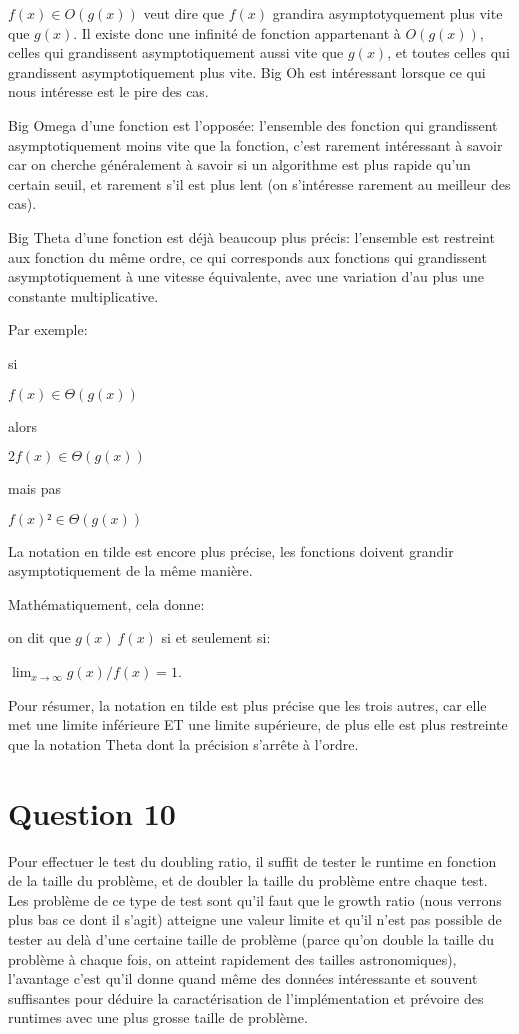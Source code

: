 \documentclass[a4paper,10pt]{article}
\begin{document}
$f(x) \in O(g(x))$ veut dire que $f(x)$ grandira asymptotyquement plus vite que $g(x)$. Il existe donc une infinité de fonction appartenant à $O(g(x))$, celles qui grandissent asymptotiquement aussi vite que $g(x)$, et toutes celles qui grandissent asymptotiquement plus vite. Big Oh est intéressant lorsque ce qui nous intéresse est le pire des cas.

Big Omega d'une fonction est l'opposée: l'ensemble des fonction qui grandissent asymptotiquement moins vite que la fonction, c'est rarement intéressant à savoir car on cherche généralement à savoir si un algorithme est plus rapide qu'un certain seuil, et rarement s'il est plus lent (on s'intéresse rarement au meilleur des cas).

Big Theta d'une fonction est déjà beaucoup plus précis: l'ensemble est restreint aux fonction du même ordre, ce qui corresponds aux fonctions qui grandissent asymptotiquement à une vitesse équivalente, avec une variation d'au plus une constante multiplicative.

Par exemple:

si

$f(x) \in \Theta(g(x))$

alors

$2f(x) \in \Theta(g(x))$

mais pas 

$f(x)² \in \Theta(g(x))$

La notation en tilde est encore plus précise, les fonctions doivent grandir asymptotiquement de la même manière.

Mathématiquement, cela donne:

on dit que $g(x) ~ f(x)$ si et seulement si:

$\lim_{x \rightarrow \infty} g(x)/f(x) = 1$.

Pour résumer, la notation en tilde est plus précise que les trois autres, car elle met une limite inférieure ET une limite supérieure, de plus elle est plus restreinte que la notation Theta dont la précision s'arrête à l'ordre.

\section*{Question 10}

Pour effectuer le test du \og{}doubling ratio\fg{}, il suffit de tester le runtime en fonction de la taille du problème, et de doubler la taille du problème entre chaque test.
Les problème de ce type de test sont qu'il faut que le \og{}growth ratio\fg{} (nous verrons plus bas ce dont il s'agit) atteigne une valeur limite et qu'il n'est pas possible de tester au delà d'une certaine taille de problème (parce qu'on double la taille du problème à chaque fois, on atteint rapidement des tailles astronomiques), l'avantage c'est qu'il donne quand même des données intéressante et souvent suffisantes pour déduire la caractérisation de l'implémentation et prévoire des runtimes avec une plus grosse taille de problème.
\end{document}

